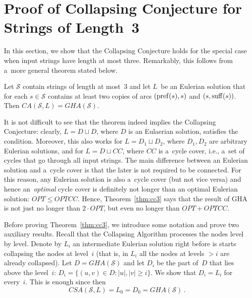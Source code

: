 \section{Proof of Collapsing Conjecture for Strings of Length~3}
\label{subsec:scs3}
In this section, we show that the Collapsing Conjecture holds for 
the special case
when input strings have length at most three. 
Remarkably, this follows from a~more general theorem stated below.

\begin{theorem}\label{thm:cc3}
Let $\mathcal{S}$ contain strings of length at most~3 and let $L$~be an Eulerian solution that for each $s \in \mathcal{S}$ contains at least two copies of arcs $(\operatorname{pref}(s), s)$ and $(s, \operatorname{suff}(s))$. Then $CA(\mathcal{S}, L)=GHA(\mathcal{S})$.
\end{theorem}

It is not difficult to see that the theorem indeed implies the Collapsing Conjecture: clearly, $L=D \sqcup D$, where $D$ is an Eulaerian solution, satisfies the condition. Moreover, this also works for $L=D_1 \sqcup D_2$, where $D_1, D_2$ are arbitrary Eulerian solutions, and for $L=D \sqcup CC$, where $CC$ is a~cycle cover, i.e., a~set of cycles that go through all input strings. The main difference between an Eulerian solution and a~cycle cover is that the later is not required to be connected. For this reason, any Eulerian solution is also a~cycle cover (but not vice versa) and hence an~{\em optimal} cycle cover is definitely not longer than an optimal Eulerian solution: $OPT \le OPTCC$. Hence, Theorem~\ref{thm:cc3} says that the result of GHA is not just no longer than $2\cdot OPT$, but even no longer than $OPT+OPTCC$.

Before proving Theorem~\ref{thm:cc3}, we introduce some notation and 
prove two auxiliary results. Recall that the Collapsing Algorithm processes the nodes level by level. Denote by $L_i$ an intermediate Eulerian solution right before is starts collapsing the nodes at level~$i$ (that is, in $L_i$ all the nodes at levels $>i$ are already collapsed). Let $D=GHA(\mathcal{S})$ and let $D_i$ be 
the part of~$D$ that lies above the level~$i$: $D_i=\{(u, v) \in D \colon |u|, |v| \ge i\}$. We show that $D_i=L_i$ for every~$i$. This is enough since then \[CSA(\mathcal{S}, L)=L_0=D_0=GHA(\mathcal{S}) \, .\]


